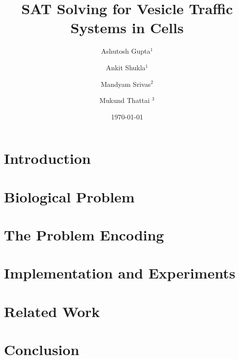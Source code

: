 \documentclass{llncs}
\begin{document}
\title{SAT Solving for Vesicle Traffic Systems in Cells}

\author{Ashutosh Gupta$^1$ \and Ankit Shukla$^1$ \and
  Mandyam Srivas$^2$ \and Mukund Thattai $^3$}


\date{\today}

\maketitle

\begin{abstract}

\end{abstract}

\section{Introduction}
\label{sec:intro}


\section{Biological Problem}
\label{sec:bio}


\section{The Problem Encoding}
\label{sec:encoding}


\section{Implementation and Experiments}
\label{sec:experiments}


\section{Related Work}
\label{sec:related}


\section{Conclusion}
\label{sec:conclusion}





\end{document}
